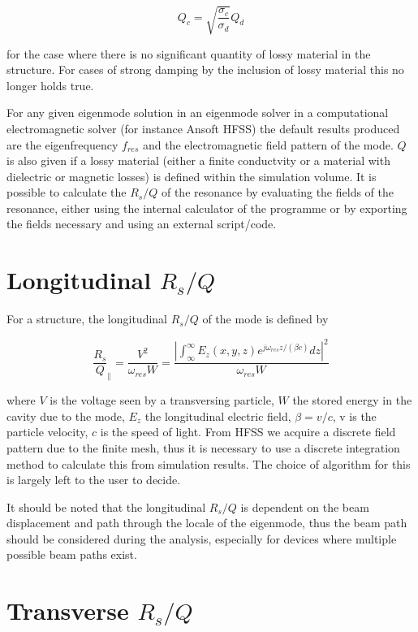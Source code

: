 \begin{equation}
Q_{c} = \sqrt{\frac{\sigma_{c}}{\sigma_{d}}}Q_{d}
\end{equation}

for the case where there is no significant quantity of lossy material in the structure. For cases of strong damping by the inclusion of lossy material this no longer holds true.

For any given eigenmode solution in an eigenmode solver in a computational electromagnetic solver (for instance Ansoft HFSS) the default results produced are the eigenfrequency $f_{res}$ and the electromagnetic field pattern of the mode. $Q$ is also given if a lossy material (either a finite conductvity or a material with dielectric or magnetic losses)  is defined within the simulation volume. It is possible to calculate the $R_{s}/Q$ of the resonance by evaluating the fields of the resonance, either using the internal calculator of the programme or by exporting the fields necessary and using an external script/code.

\section{Longitudinal $R_{s}/Q$}

For a structure, the longitudinal $R_{s}/Q$ of the mode is defined by

\begin{equation}
\frac{R_{s}}{Q}_{\parallel} = \frac{V^{2}}{\omega_{res} W} = \frac{\left| \int^{\infty}_{\infty} E_{z} \left( x,y,z \right) e^{j \omega_{res}z/\left( \beta c \right)} dz \right|^{2}}{\omega_{res} W} 
\end{equation}

where $V$ is the voltage seen by a transversing particle, $W$ the stored energy in the cavity due to the mode, $E_{z}$ the longitudinal electric field, $\beta = v/c$, v is the particle velocity, $c$ is the speed of light. From HFSS we acquire a discrete field pattern due to the finite mesh, thus it is necessary to use a discrete integration method to calculate this from simulation results. The choice of algorithm for this is largely left to the user to decide.

It should be noted that the longitudinal $R_{s}/Q$ is dependent on the beam displacement and path through the locale of the eigenmode, thus the beam path should be considered during the analysis, especially for devices where multiple possible beam paths exist.

\section{Transverse $R_{s}/Q$}

